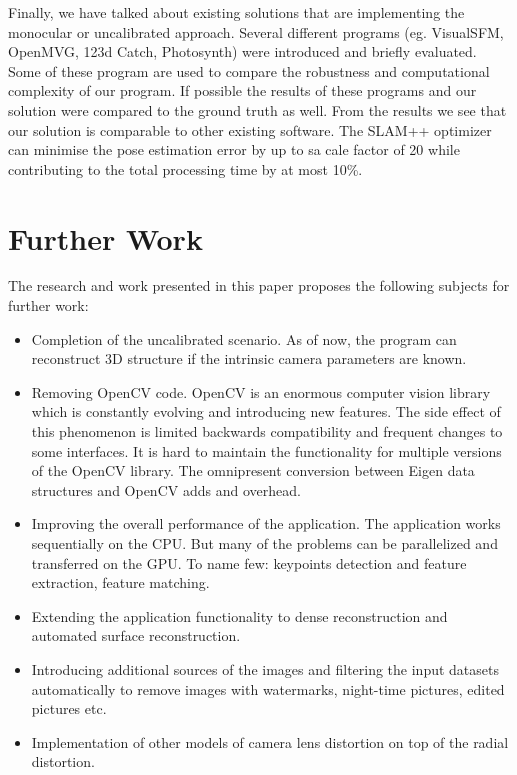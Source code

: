 Finally, we have talked about existing solutions that are implementing the monocular or uncalibrated approach. Several different programs (eg. VisualSFM, OpenMVG, 123d Catch, Photosynth) were introduced and briefly evaluated. Some of these program are used to compare the robustness and computational complexity of our program. If possible the results of these programs and our solution were compared to the ground truth as well. From the results we see that our solution is comparable to other existing software. The SLAM++ optimizer can minimise the pose estimation error by up to sa cale factor of 20 while contributing to the total processing time by at most 10\%. 

\section{Further Work}
The research and work presented in this paper proposes the following subjects for further work:
\begin{itemize}
	\item Completion of the uncalibrated scenario. As of now, the program can reconstruct 3D structure if the intrinsic camera parameters are known.
	
	\item Removing OpenCV code. OpenCV is an enormous computer vision library which is constantly evolving and introducing new features. The side effect of this phenomenon is limited backwards compatibility and frequent changes to some interfaces. It is hard to maintain the functionality for multiple versions of the OpenCV library. The omnipresent conversion between Eigen data structures and OpenCV  adds and overhead.
	
	\item Improving the overall performance of the application. The application works sequentially on the CPU. But many of the problems can be parallelized and transferred on the GPU. To name few: keypoints detection and feature extraction, feature matching.
	
	\item Extending the application functionality to dense reconstruction and automated surface reconstruction.
	
	\item Introducing additional sources of the images and filtering the input datasets automatically to remove images with watermarks, night-time pictures, edited pictures etc.
	
	\item Implementation of other models of camera lens distortion on top of the radial distortion.
\end{itemize}
